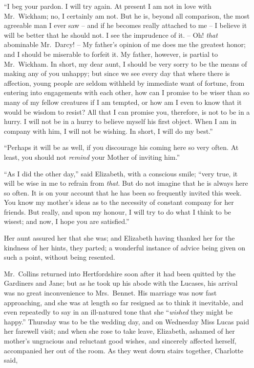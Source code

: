 “I beg your pardon. I will try again. At present I am
not in love with Mr.\ Wickham; no, I certainly am not.
But he is, beyond all comparison, the most agreeable
man I ever saw -- and if he becomes really attached to me -- I
believe it will be better that he should not. I see the
imprudence of it. -- Oh! \textit{that} abominable Mr.\ Darcy! -- My
father’s opinion of me does me the greatest honor;
and I should be miserable to forfeit it. My father, however,
is partial to Mr.\ Wickham. In short, my dear aunt,
I should be very sorry to be the means of making any
of you unhappy; but since we see every day that where
there is affection, young people are seldom withheld by
immediate want of fortune, from entering into engagements
with each other, how can I promise to be wiser
than so many of my fellow creatures if I am tempted,
or how am I even to know that it would be wisdom to
resist? All that I can promise you, therefore, is not to
be in a hurry. I will not be in a hurry to believe myself
his first object. When I am in company with him, I will
not be wishing. In short, I will do my best.”

“Perhaps it will be as well, if you discourage his coming
here so very often. At least, you should not \textit{remind} your
Mother of inviting him.”

“As I did the other day,” said Elizabeth, with a conscious
smile; “very true, it will be wise in me to
refrain from \textit{that}. But do not imagine that he is always
here so often. It is on your account that he has been so
frequently invited this week. You know my mother’s
ideas as to the necessity of constant company for her
friends. But really, and upon my honour, I will try to
do what I think to be wisest; and now, I hope you are
satisfied.”

Her aunt assured her that she was; and Elizabeth
having thanked her for the kindness of her hints, they
parted; a wonderful instance of advice being given on
such a point, without being resented.

Mr.\ Collins returned into Hertfordshire soon after it had
been quitted by the Gardiners and Jane; but as he took
up his abode with the Lucases, his arrival was no great
inconvenience to Mrs.\ Bennet. His marriage was now
fast approaching, and she was at length so far resigned
as to think it inevitable, and even repeatedly to say in
an ill-natured tone that she “\textit{wished} they might be happy.”
Thursday was to be the wedding day, and on Wednesday
Miss Lucas paid her farewell visit; and when she rose
to take leave, Elizabeth, ashamed of her mother’s
ungracious and reluctant good wishes, and sincerely affected
herself, accompanied her out of the room. As they went
down stairs together, Charlotte said,

